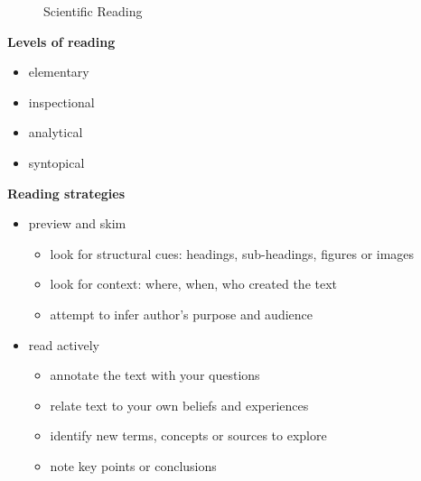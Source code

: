 \begin{frame}
\begin{figure}[htp]\centering
\caption{Scientific Reading}
\end{figure}
\nocite{Adler.1972}
\end{frame}
\begin{frame}\textbf{Levels of reading}\vspace{0.3cm}
\begin{itemize}\setlength\itemsep{1em}
\item elementary
\item inspectional
\item analytical
\item syntopical
\end{itemize}
\end{frame}
\begin{frame}\textbf{Reading strategies}\vspace{0.3cm}
\begin{itemize}\setlength\itemsep{1em}
\item preview and skim\medskip
\begin{itemize}\setlength\itemsep{1em}
\item look for structural cues: headings, sub-headings, figures or images
\item look for context: where, when, who created the text
\item attempt to infer author's purpose and audience
\end{itemize}
\end{itemize}
\end{frame}
\begin{frame}
\begin{itemize}\setlength\itemsep{1em}
\item read actively\medskip
\begin{itemize}\setlength\itemsep{1em}
\item annotate the text with your questions
\item relate text to your own beliefs and experiences
\item identify new terms, concepts or sources to explore
\item note key points or conclusions
\end{itemize}
\end{itemize}
\end{frame}
